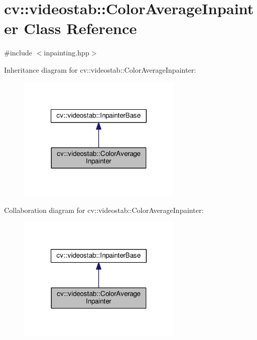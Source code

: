\hypertarget{classcv_1_1videostab_1_1ColorAverageInpainter}{\section{cv\-:\-:videostab\-:\-:Color\-Average\-Inpainter Class Reference}
\label{classcv_1_1videostab_1_1ColorAverageInpainter}
}


{\ttfamily \#include $<$inpainting.\-hpp$>$}



Inheritance diagram for cv\-:\-:videostab\-:\-:Color\-Average\-Inpainter\-:\nopagebreak
\begin{figure}[H]
\begin{center}
\leavevmode
\includegraphics[width=220pt]{classcv_1_1videostab_1_1ColorAverageInpainter__inherit__graph}
\end{center}
\end{figure}


Collaboration diagram for cv\-:\-:videostab\-:\-:Color\-Average\-Inpainter\-:\nopagebreak
\begin{figure}[H]
\begin{center}
\leavevmode
\includegraphics[width=220pt]{classcv_1_1videostab_1_1ColorAverageInpainter__coll__graph}
\end{center}
\end{figure}
